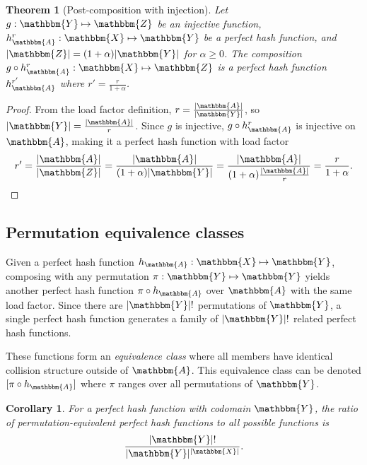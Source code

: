 \documentclass[hidelinks,11pt,final]{article}
\newcommand{\envnumstyle}{section}
\theoremstyle{plain}
\newtheorem{theorem}{Theorem}[\envnumstyle]
\newtheorem{corollary}{Corollary}[theorem]
\begin{document}
\begin{theorem}[Post-composition with injection]
Let $g : \mathbbm{Y} \mapsto \mathbbm{Z}$ be an injective function, $h_\mathbbm{A}^r : \mathbbm{X} \mapsto \mathbbm{Y}$ be a perfect hash function, and $|\mathbbm{Z}| = (1 + \alpha) |\mathbbm{Y}|$ for $\alpha \geq 0$.
The composition $g \circ h_\mathbbm{A}^r : \mathbbm{X} \mapsto \mathbbm{Z}$ is a perfect hash function $h_\mathbbm{A}^{r'}$ where $r' = \frac{r}{1+\alpha}$.
\end{theorem}
\begin{proof}
From the load factor definition, $r = \frac{|\mathbbm{A}|}{|\mathbbm{Y}|}$, so $|\mathbbm{Y}| = \frac{|\mathbbm{A}|}{r}$.
Since $g$ is injective, $g \circ h_\mathbbm{A}^r$ is injective on $\mathbbm{A}$, making it a perfect hash function with load factor
\begin{equation}
	r' = \frac{|\mathbbm{A}|}{|\mathbbm{Z}|} = \frac{|\mathbbm{A}|}{(1+\alpha)|\mathbbm{Y}|} = \frac{|\mathbbm{A}|}{(1+\alpha)\frac{|\mathbbm{A}|}{r}} = \frac{r}{1+\alpha}.
\end{equation}
\end{proof}

\subsection{Permutation equivalence classes}

Given a perfect hash function $h_\mathbbm{A} : \mathbbm{X} \mapsto \mathbbm{Y}$, composing with any permutation $\pi : \mathbbm{Y} \mapsto \mathbbm{Y}$ yields another perfect hash function $\pi \circ h_\mathbbm{A}$ over $\mathbbm{A}$ with the same load factor. Since there are $|\mathbbm{Y}|!$ permutations of $\mathbbm{Y}$, a single perfect hash function generates a family of $|\mathbbm{Y}|!$ related perfect hash functions.

These functions form an \emph{equivalence class} where all members have identical collision structure outside of $\mathbbm{A}$. This equivalence class can be denoted $[\pi \circ h_\mathbbm{A}]$ where $\pi$ ranges over all permutations of $\mathbbm{Y}$.

\begin{corollary}
For a perfect hash function with codomain $\mathbbm{Y}$, the ratio of permutation-equivalent perfect hash functions to all possible functions is
\begin{equation}
	\frac{|\mathbbm{Y}|!}{|\mathbbm{Y}|^{|\mathbbm{X}|}}.
\end{equation}
\end{corollary}
\end{document}
